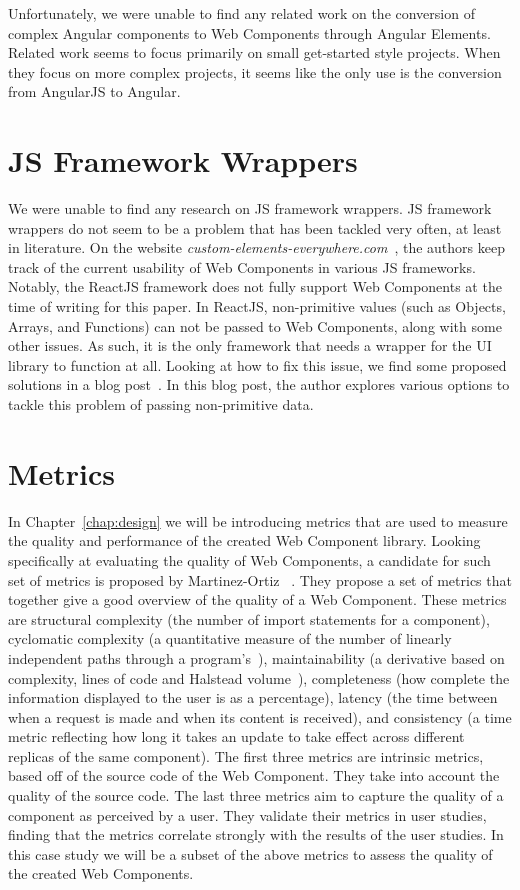 Unfortunately, we were unable to find any related work on the conversion of complex Angular components to Web Components through Angular Elements. Related work seems to focus primarily on small get-started style projects. When they focus on more complex projects, it seems like the only use is the conversion from AngularJS to Angular.

\section{JS Framework Wrappers}
We were unable to find any research on JS framework wrappers. JS framework wrappers do not seem to be a problem that has been tackled very often, at least in literature. On the website \emph{custom-elements-everywhere.com}~, the authors keep track of the current usability of Web Components in various JS frameworks. Notably, the ReactJS framework does not fully support Web Components at the time of writing for this paper. In ReactJS, non-primitive values (such as Objects, Arrays, and Functions) can not be passed to Web Components, along with some other issues. As such, it is the only framework that needs a wrapper for the UI library to function at all. Looking at how to fix this issue, we find some proposed solutions in a blog post~. In this blog post, the author explores various options to tackle this problem of passing non-primitive data.

\section{Metrics}\label{sec:related-work:metrics}
In Chapter~\ref{chap:design} we will be introducing metrics that are used to measure the quality and performance of the created Web Component library. Looking specifically at evaluating the quality of Web Components, a candidate for such set of metrics is proposed by Martinez-Ortiz \etal{}~\cite{martinez-ortiz2016quality}. They propose a set of metrics that together give a good overview of the quality of a Web Component. These metrics are structural complexity (the number of import statements for a component), cyclomatic complexity (a quantitative measure of the number of linearly independent paths through a program's~\cite{1702388}), maintainability (a derivative based on complexity, lines of code and Halstead volume~\cite{halstead1977elements}), completeness (how complete the information displayed to the user is as a percentage), latency (the time between when a request is made and when its content is received), and consistency (a time metric reflecting how long it takes an update to take effect across different replicas of the same component). The first three metrics are intrinsic metrics, based off of the source code of the Web Component. They take into account the quality of the source code. The last three metrics aim to capture the quality of a component as perceived by a user. They validate their metrics in user studies, finding that the metrics correlate strongly with the results of the user studies.
In this case study we will be a subset of the above metrics to assess the quality of the created Web Components.

